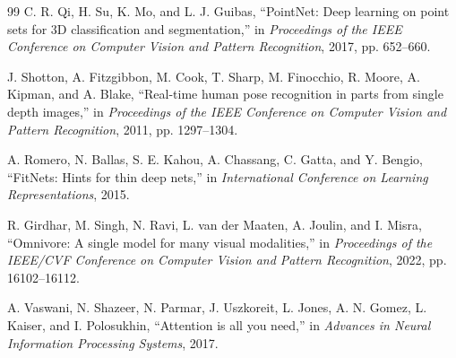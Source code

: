 \documentclass[preprint,12pt]{elsarticle}
\begin{document}
\begin{thebibliography}{99}
C. R. Qi, H. Su, K. Mo, and L. J. Guibas, ``PointNet: Deep learning on point sets for 3D classification and segmentation,'' in \emph{Proceedings of the IEEE Conference on Computer Vision and Pattern Recognition}, 2017, pp. 652--660.

J. Shotton, A. Fitzgibbon, M. Cook, T. Sharp, M. Finocchio, R. Moore, A. Kipman, and A. Blake, ``Real-time human pose recognition in parts from single depth images,'' in \emph{Proceedings of the IEEE Conference on Computer Vision and Pattern Recognition}, 2011, pp. 1297--1304.

A. Romero, N. Ballas, S. E. Kahou, A. Chassang, C. Gatta, and Y. Bengio, ``FitNets: Hints for thin deep nets,'' in \emph{International Conference on Learning Representations}, 2015.

R. Girdhar, M. Singh, N. Ravi, L. van der Maaten, A. Joulin, and I. Misra, ``Omnivore: A single model for many visual modalities,'' in \emph{Proceedings of the IEEE/CVF Conference on Computer Vision and Pattern Recognition}, 2022, pp. 16102--16112.

A. Vaswani, N. Shazeer, N. Parmar, J. Uszkoreit, L. Jones, A. N. Gomez, L. Kaiser, and I. Polosukhin, ``Attention is all you need,'' in \emph{Advances in Neural Information Processing Systems}, 2017.

\end{thebibliography}
\end{document}
